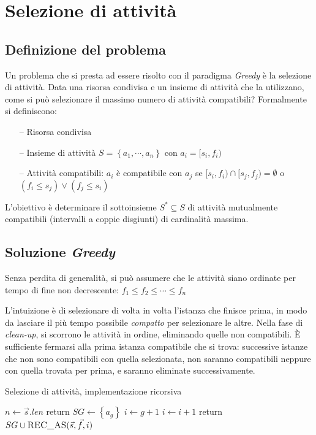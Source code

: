 \section{Selezione di attività}

\subsection{Definizione del problema}

Un problema che si presta ad essere risolto con il paradigma \emph{Greedy} è la selezione di attività. Data una risorsa condivisa e un insieme di attività che la utilizzano, come si può selezionare il massimo numero di attività compatibili? Formalmente si definiscono:
\begin{itemize}
    \item[--] Risorsa condivisa
    \item[--] Insieme di attività $S = \left\{ a_1, \cdots, a_n \right\}$ con $a_i = [s_i, f_i)$
    \item[--] Attività compatibili: $a_i$ è compatibile con $a_j$ se
        $[s_i, f_i) \cap [s_j, f_j) = \emptyset$
        o
        $(f_i \leq s_j ) \vee (f_j \leq s_i)$
\end{itemize}
L'obiettivo è determinare il sottoinsieme $S^* \subseteq S$ di attività mutualmente compatibili (intervalli a coppie disgiunti) di cardinalità massima.

\subsection{Soluzione \emph{Greedy}}

Senza perdita di generalità, si può assumere che le attività siano ordinate per tempo di fine non decrescente:
$f_1 \leq f_2 \leq \cdots \leq f_n$

L'intuizione è di selezionare di volta in volta l'istanza che finisce prima, in modo da lasciare il più tempo possibile \emph{compatto} per selezionare le altre. Nella fase di \emph{clean-up}, si scorrono le attività in ordine, eliminando quelle non compatibili. È sufficiente fermarsi alla prima istanza compatibile che si trova: successive istanze che non sono compatibili con quella selezionata, non saranno compatibili neppure con quella trovata per prima, e saranno eliminate successivamente.

\begin{algorithm}[H]
\caption{Selezione di attività, implementazione ricorsiva}\label{alg:asrec}
\begin{algorithmic}[1]
        \State $n \gets \vec{s}.len$
            \State return
        \EndIf
        \State $SG \gets \left\{ a_g \right\}$
        \State $i \gets g+1$
            \State $i \gets i+1$
        \EndWhile
        \State return $SG \cup \Call{REC\_AS}{\vec{s}, \vec{f}, i}$
    \EndProcedure
\end{algorithmic}
\end{algorithm}

